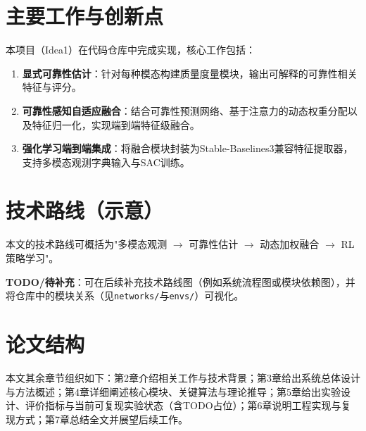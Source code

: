 \section{主要工作与创新点}
本项目（Idea1）在代码仓库中完成实现，核心工作包括：
\begin{enumerate}
    \item \textbf{显式可靠性估计}：针对每种模态构建质量度量模块，输出可解释的可靠性相关特征与评分。
    \item \textbf{可靠性感知自适应融合}：结合可靠性预测网络、基于注意力的动态权重分配以及特征归一化，实现端到端特征级融合。
    \item \textbf{强化学习端到端集成}：将融合模块封装为Stable-Baselines3兼容特征提取器，支持多模态观测字典输入与SAC训练。
\end{enumerate}

\section{技术路线（示意）}
本文的技术路线可概括为"多模态观测 $\rightarrow$ 可靠性估计 $\rightarrow$ 动态加权融合 $\rightarrow$ RL策略学习"。

\textbf{TODO/待补充}：可在后续补充技术路线图（例如系统流程图或模块依赖图），并将仓库中的模块关系（见\texttt{networks/}与\texttt{envs/}）可视化。

\section{论文结构}
本文其余章节组织如下：第2章介绍相关工作与技术背景；第3章给出系统总体设计与方法概述；第4章详细阐述核心模块、关键算法与理论推导；第5章给出实验设计、评价指标与当前可复现实验状态（含TODO占位）；第6章说明工程实现与复现方式；第7章总结全文并展望后续工作。
